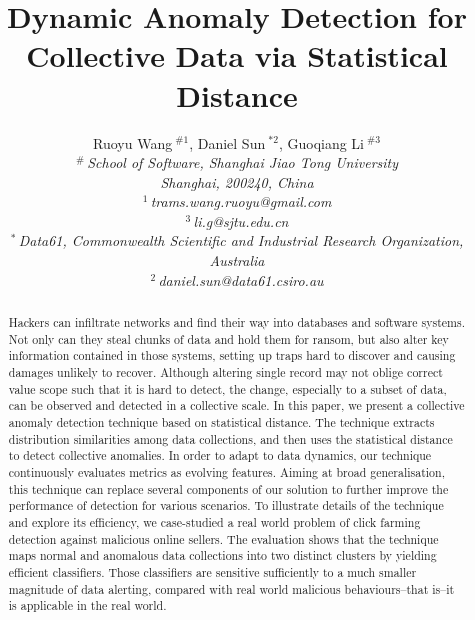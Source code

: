 \documentclass[10pt,conference,letterpaper]{IEEEtran}
\title{Dynamic Anomaly Detection for Collective Data via Statistical Distance}
\author{%
	{Ruoyu Wang{\small $~^{\#1}$}, Daniel Sun{\small $~^{*2}$}, Guoqiang Li{\small $~^{\#3}$} }%
	\vspace{1.6mm}\\
	\fontsize{10}{10}\selectfont\itshape
	$^{\#}$\,School of Software, Shanghai Jiao Tong University\\
	Shanghai, 200240, China\\
	\fontsize{9}{9}\selectfont\ttfamily\upshape
	$^{1}$\,trams.wang.ruoyu@gmail.com\\
	$^{3}$\,li.g@sjtu.edu.cn%
	\vspace{1.2mm}\\
	\fontsize{10}{10}\selectfont\rmfamily\itshape
	$^{*}$\,Data61, Commonwealth Scientific and Industrial Research Organization, Australia\\
	\fontsize{9}{9}\selectfont\ttfamily\upshape
	$^{2}$\,daniel.sun@data61.csiro.au
}
\begin{document}
\maketitle
%
	\begin{abstract} 
		Hackers can infiltrate networks and find their way into databases and software systems. Not only
		can they steal chunks of data and hold them for ransom, but
		also alter key information contained in those systems, setting up
		traps hard to discover and causing damages unlikely to recover.
		Although altering single record may not oblige correct value scope such that it is hard to detect, the change, especially to a subset of data, can be observed and detected in a collective
		scale. In this paper, we present a collective anomaly
		detection technique based on statistical distance. The technique
		extracts distribution similarities among data collections, and then uses the statistical distance to detect
		collective anomalies. In order to adapt to data dynamics, our technique continuously evaluates 
		metrics as evolving features. Aiming at broad generalisation, this
		technique can replace several components of our solution to further improve the
		performance of detection for various scenarios. To illustrate details of the technique
		and explore its efficiency, we case-studied a real
		world problem of click farming detection against malicious online
		sellers. The evaluation shows that the technique maps normal
		and anomalous data collections into two distinct clusters by yielding
		efficient classifiers. Those classifiers are sensitive sufficiently to
		a much smaller magnitude of data alerting, compared with real
		world malicious behaviours--that is--it is applicable in the real world. 
	\end{abstract}

%
\end{document}
